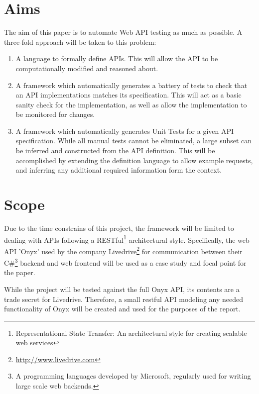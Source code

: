\section{Aims}
The aim of this paper is to automate Web API testing as much as possible. A three-fold approach will be taken to this problem:
\begin{enumerate}
  \item A language to formally define APIs. This will allow the API to be computationally modified and reasoned about.
  \item A framework which automatically generates a battery of tests to check that an API implementations matches its specification. This will act as a basic sanity check for the implementation, as well as allow the implementation to be monitored for changes.
  \item A framework which automatically generates Unit Tests for a given API specification. While all manual tests cannot be eliminated, a large subset can be inferred and constructed from the API definition. This will be accomplished by extending the definition language to allow example requests, and inferring any additional required information form the context. 
\end{enumerate}

\section{Scope}
Due to the time constrains of this project, the framework will be limited to dealing with APIs following a RESTful\footnote{Representational State Transfer: An architectural style for creating scalable web services} architectural style. Specifically, the web API 'Onyx' used by the company Livedrive\footnote{\url{http://www.livedrive.com}} for communication between their C\#\footnote{A programming languages developed by Microsoft, regularly used for writing large scale web backends.} backend and web frontend will be used as a case study and focal point for the paper.

While the project will be tested against the full Onyx API, its contents are a trade secret for Livedrive. Therefore, a small restful API modeling any needed functionality of Onyx will be created and used for the purposes of the report.